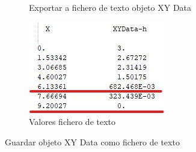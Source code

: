 \begin{itemize}
\begin{figure}[!h]
\begin{subfigure}[!h]{0.33\textwidth}
       \caption{Exportar a fichero de texto objeto XY Data}
       \label{post36}
     \end{subfigure}%
     \begin{subfigure}[!h]{0.33\textwidth}
       \includegraphics[width=\textwidth]{./body/images/29c.jpg}
       \caption{Valores fichero de texto}
       \label{post37}
     \end{subfigure}%
     \caption{Guardar objeto XY Data como fichero de texto}
   \end{figure}


\end{itemize}
